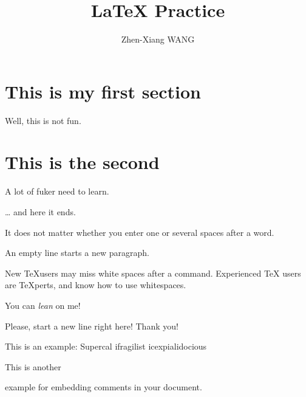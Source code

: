 \documentclass[11pt]{article}
\author{Zhen-Xiang WANG}
\title{\LaTeX{} Practice}
\begin{document}
    \maketitle
    \tableofcontents
    \section{This is my first section}\label{sec:thisIsMyFirstSection}
    Well, this is not fun.
    \section{This is the second}\label{sec:thisIsMySecondSection}
    A lot of fuker need to learn.

    \ldots{} and here it ends.

    It does not matter whether you
    enter one or several spaces
    after a word.

    An empty line starts a new
    paragraph.

    New \TeX users may miss white spaces after a command.
    Experienced \TeX{} users are \TeX perts, and know how to use whitespaces.

    You can \textsl{lean} on me!

    Please, start a new line
    right here!\newline
    Thank you!


    This is an %
    example: Supercal%
    ifragilist%
    icexpialidocious

    This is another
    \begin{comment}
        rather stupid,
        but helpful
    \end{comment}
    example for embedding
    comments in your document.
\end{document}
